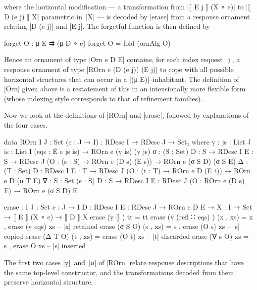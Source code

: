 where the horizontal modification --- a transformation from |⟦ E j ⟧ (X ∘ e)| to |⟦ D (e j) ⟧ X| parametric in~|X| --- is decoded by |erase| from a response ornament relating |D (e j)| and |E j|.
The forgetful function is then defined by
\begin{code}
forget O : μ E ⇉ (μ D ∘ e)
forget O = fold (ornAlg O)
\end{code}
Hence an ornament of type |Orn e D E| contains, for each index request~|j|, a response ornament of type |ROrn e (D (e j)) (E j)| to cope with all possible horizontal structures that can occur in a |(μ E)|--inhabitant.
The definition of |Orn| given above is a restatement of this in an intensionally more flexible form (whose indexing style corresponds to that of refinement families).

Now we look at the definitions of |ROrn| and |erase|, followed by explanations of the four cases.
\begin{code}
data ROrn {I J : Set} (e : J → I) : RDesc I → RDesc J → Set₁ where
  ṿ   :  {js : List J} {is : List I} (eqs : Ė e js is) → ROrn e (ṿ is) (ṿ js)
  σ   :  (S : Set) {D : S → RDesc I} {E : S → RDesc J}
         (O : (s : S) → ROrn e (D s) (E s)) → ROrn e (σ S D) (σ S E)
  Δ   :  (T : Set) {D : RDesc I} {E : T → RDesc J}
         (O : (t : T) → ROrn e D (E t)) → ROrn e D (σ T E)
  ∇   :  {S : Set} (s : S) {D : S → RDesc I} {E : RDesc J}
         (O : ROrn e (D s) E) → ROrn e (σ S D) E
           
erase :  {I J : Set} {e : J → I} {D : RDesc I} {E : RDesc J} →
         ROrn e D E → {X : I → Set} → ⟦ E ⟧ (X ∘ e) → ⟦ D ⟧ X
erase (ṿ []            )  tt         = tt
erase (ṿ (refl ∷ eqs)  )  (x ,  xs)  = x  ,  erase (ṿ eqs)  xs  -- |x| retained
erase (σ S O)             (s ,  xs)  = s  ,  erase (O s)    xs  -- |s| copied
erase (Δ T O)             (t ,  xs)  =       erase (O t)    xs  -- |t| discarded
erase (∇ s O)                   xs   = s  ,  erase O        xs  -- |s| inserted
\end{code}
The first two cases |ṿ|~and~|σ| of |ROrn| relate response descriptions that have the same top-level constructor, and the transformations decoded from them preserve horizontal structure.
